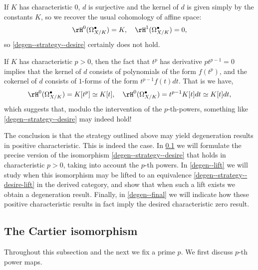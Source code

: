 \begin{nothing}
  If $K$ has characteristic $0$, $d$ is surjective and the kernel of $d$ is given simply by the constants $K$, so we recover the usual cohomology of affine space:
  \[
    \rH^0(\Omega_{X/K}^\bullet) = K, \quad
    \rH^1(\Omega_{X/K}^\bullet) = 0,
  \]
  so \cref{degen--strategy--desire} certainly does not hold.

  If $K$ has characteristic $p > 0$, then the fact that $t^p$ has derivative $pt^{p-1} = 0$ implies that the kernel of $d$ consists of polynomials of the form $f(t^p)$, and the cokernel of $d$ consists of $1$-forms of the form $t^{p-1}f(t)dt$. That is we have,
  \[
    \rH^0(\Omega_{X/K}^\bullet) = K[t^p] \iso K[t], \quad \rH^0(\Omega_{X/K}^\bullet) = t^{p-1}K[t]dt \iso K[t]dt,
  \]
  which suggests that, modulo the intervention of the $p$-th-powers, something like \cref{degen--strategy--desire} may indeed hold!

  The conclusion is that the strategy outlined above may yield degeneration results in positive characteristic. This is indeed the case. In \cref{degen--cartier} we will formulate the precise version of the isomorphism \cref{degen--strategy--desire} that holds in characteristic $p> 0$, taking into account the $p$-th powers. In \cref{degen--lift} we will study when this isomorphism may be lifted to an equivalence \cref{degen--strategy--desire-lift} in the derived category, and show that when such a lift exists we obtain a degeneration result. Finally, in \cref{degen--final} we will indicate how these positive characteristic results in fact imply the desired characteristic zero result.
\end{nothing}


\subsection{The Cartier isomorphism}
\label{degen--cartier}

Throughout this subsection and the next we fix a prime $p$. We first discuss $p$-th power maps.

